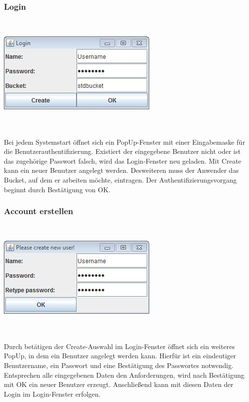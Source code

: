 \documentclass[13pt,a4paper,bibliography=totocnumbered,listof=totocnumbered]{scrartcl}
\begin{document}
\subsubsection{Login}
$\;$\\
\begin{minipage}{\linewidth}
	\centering
	\includegraphics[width=0.4\linewidth]{./img/Login.jpg}
	\label{Login}
\end{minipage}
\\\\Bei jedem Systemstart öffnet sich ein PopUp-Fenster mit einer Eingabemaske für die Benutzerauthentifizierung. Existiert der eingegebene Benutzer nicht oder ist das zugehörige Passwort falsch, wird das Login-Fenster neu geladen. Mit Create kann ein neuer Benutzer angelegt werden. Desweiteren muss der Anwender das Bucket, auf dem er arbeiten möchte, eintragen. Der Authentifizierungsvorgang beginnt durch Bestätigung von OK.

\subsubsection{Account erstellen}
$\;$\\
\begin{minipage}{\linewidth}
	\centering
	\includegraphics[width=0.4\linewidth]{./img/Create.jpg}
	\label{Create}
\end{minipage}
\\\\Durch betätigen der Create-Auswahl im Login-Fenster öffnet sich ein weiteres PopUp, in dem ein Benutzer angelegt werden kann. Hierfür ist ein eindeutiger Benutzername, ein Passwort und eine Bestätigung des Passwortes notwendig. Entsprechen alle eingegebenen Daten den Anforderungen, wird nach Bestätigung mit OK ein neuer Benutzer erzeugt. Anschließend kann mit diesen Daten der Login im Login-Fenster erfolgen.
\end{document}
